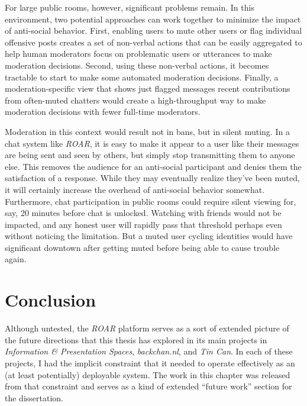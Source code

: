 For large public rooms, however, significant problems remain. In this environment, two potential approaches can work together to minimize the impact of anti-social behavior. First, enabling users to mute other users or flag individual offensive posts creates a set of non-verbal actions that can be easily aggregated to help human moderators focus on problematic users or utterances to make moderation decisions. Second, using these non-verbal actions, it becomes tractable to start to make some automated moderation decisions. Finally, a moderation-specific view that shows just flagged messages recent contributions from often-muted chatters would create a high-throughput way to make moderation decisions with fewer full-time moderators.

Moderation in this context would result not in bans, but in silent muting. In a chat system like \emph{ROAR}, it is easy to make it appear to a user like their messages are being sent and seen by others, but simply stop transmitting them to anyone else. This removes the audience for an anti-social participant and denies them the satisfaction of a response. While they may eventually realize they've been muted, it will certainly increase the overhead of anti-social behavior somewhat. Furthermore, chat participation in public rooms could require silent viewing for, say, 20 minutes before chat is unlocked. Watching with friends would not be impacted, and any honest user will rapidly pass that threshold perhaps even without noticing the limitation. But a muted user cycling identities would have significant downtown after getting muted before being able to cause trouble again.




\section{Conclusion}

Although untested, the \emph{ROAR} platform serves as a sort of extended picture of the future directions that this thesis has explored in its main projects in \emph{Information \& Presentation Spaces}, \emph{backchan.nl}, and \emph{Tin Can}. In each of these projects, I had the implicit constraint that it needed to operate effectively as an (at least potentially) deployable system. The work in this chapter was released from that constraint and serves as a kind of extended ``future work'' section for the dissertation.

